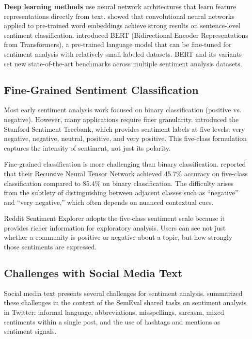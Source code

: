 \textbf{Deep learning methods} use neural network architectures that learn feature representations directly from text.  showed that convolutional neural networks applied to pre-trained word embeddings achieve strong results on sentence-level sentiment classification.  introduced BERT (Bidirectional Encoder Representations from Transformers), a pre-trained language model that can be fine-tuned for sentiment analysis with relatively small labeled datasets. BERT and its variants set new state-of-the-art benchmarks across multiple sentiment analysis datasets.

\subsection{Fine-Grained Sentiment Classification}

Most early sentiment analysis work focused on binary classification (positive vs. negative). However, many applications require finer granularity.  introduced the Stanford Sentiment Treebank, which provides sentiment labels at five levels: very negative, negative, neutral, positive, and very positive. This five-class formulation captures the intensity of sentiment, not just its polarity.

Fine-grained classification is more challenging than binary classification.  reported that their Recursive Neural Tensor Network achieved 45.7\% accuracy on five-class classification compared to 85.4\% on binary classification. The difficulty arises from the subtlety of distinguishing between adjacent classes such as ``negative'' and ``very negative,'' which often depends on nuanced contextual cues.

Reddit Sentiment Explorer adopts the five-class sentiment scale because it provides richer information for exploratory analysis. Users can see not just whether a community is positive or negative about a topic, but how strongly those sentiments are expressed.

\subsection{Challenges with Social Media Text}

Social media text presents several challenges for sentiment analysis.  summarized these challenges in the context of the SemEval shared tasks on sentiment analysis in Twitter: informal language, abbreviations, misspellings, sarcasm, mixed sentiments within a single post, and the use of hashtags and mentions as sentiment signals.

